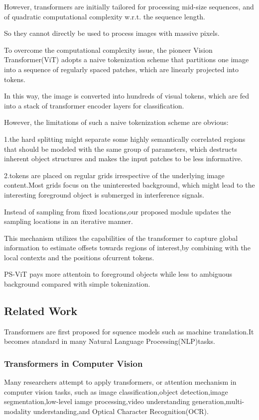 \documentclass[11pt]{article}
\begin{document}
However, transformers are initially tailored for processing mid-size sequences, and of quadratic
computational complexity w.r.t. the sequence length.

So they cannot directly be used to process images with massive pixels.

To overcome the computational complexity issue, the pioneer Vision Transformer(ViT) adopts a naive tokenization scheme that partitions one image into a sequence of regularly spaced patches, which are linearly projected into tokens. 

In this way, the image is converted into hundreds of visual tokens, which are fed into a stack of transformer encoder layers for classification. 

However, the limitations of such a naive tokenization scheme are obvious:

1.the hard splitting might separate some highly semantically correlated regions that should be modeled with the same group of parameters, which destructs inherent object structures and makes the input patches to be less informative.

2.tokens are placed on regular grids irrespective of the underlying image content.Most grids focus on the uninterested background, which might lead to the interesting foreground object is submerged in interference signals.

Instead of sampling from fixed locations,our proposed module updates the sampling locations in an iterative manner.

This mechanism utilizes the capabilities of the transformer to capture global information to estimate offsets towards regions of interest,by combining with the local contexts and the positions ofcurrent tokens.

PS-ViT pays more attentoin to foreground objects while less to ambiguous background compared with simple tokenization.
\subsection{Related Work}
Transformers are first proposed for squence models such as machine translation.It becomes atandard in many Natural Language Processing(NLP)tasks.

\subsubsection{Transformers in Computer Vision}
Many researchers attempt to apply transformers, or attention mechanism in computer vision tasks, such as image classification,object detection,image segmentation,low-level iamge processing,video understanding generation,multi-modality understanding,and Optical Character Recognition(OCR).
\end{document}
